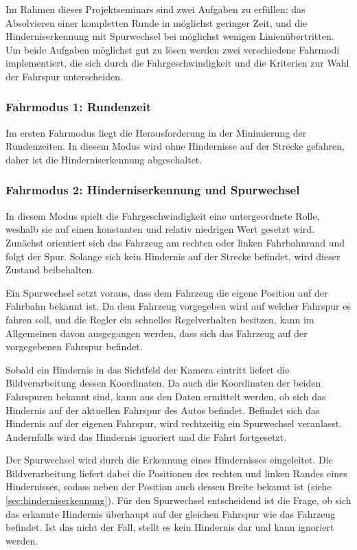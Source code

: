 Im Rahmen dieses Projektseminars sind zwei Aufgaben zu erfüllen: das Absolvieren einer kompletten Runde in möglichst geringer Zeit, und die Hinderniserkennung mit Spurwechsel bei möglichst wenigen Linienübertritten. Um beide Aufgaben möglichst gut zu lösen werden zwei verschiedene Fahrmodi implementiert, die sich durch die Fahrgeschwindigkeit und die Kriterien zur Wahl der Fahrspur unterscheiden.

\subsubsection{Fahrmodus 1: Rundenzeit}


Im ersten Fahrmodus liegt die Herausforderung in der Minimierung der Rundenzeiten. In diesem Modus wird ohne Hindernisse auf der Strecke gefahren, daher ist die Hinderniserkennung abgeschaltet. 

\subsubsection{Fahrmodus 2: Hinderniserkennung und Spurwechsel}

In diesem Modus spielt die Fahrgeschwindigkeit eine untergeordnete Rolle, weshalb sie auf einen konstanten und relativ niedrigen Wert gesetzt wird. Zunächst orientiert sich das Fahrzeug am rechten oder linken Fahrbahnrand und folgt der Spur. Solange sich kein Hindernis auf der Strecke befindet, wird dieser Zustand beibehalten. 

Ein Spurwechsel setzt voraus, dass dem Fahrzeug die eigene Position auf der Fahrbahn bekannt ist. Da dem Fahrzeug vorgegeben wird auf welcher Fahrspur es fahren soll, und die Regler ein schnelles Regelverhalten besitzen, kann im Allgemeinen davon ausgegangen werden, dass sich das Fahrzeug auf der vorgegebenen Fahrspur befindet.

Sobald ein Hindernis in das Sichtfeld der Kamera eintritt liefert die Bildverarbeitung dessen Koordinaten. Da auch die Koordinaten der beiden Fahrspuren bekannt sind, kann aus den Daten ermittelt werden, ob sich das Hindernis auf der aktuellen Fahrspur des Autos befindet. Befindet sich das Hindernis auf der eigenen Fahrspur, wird rechtzeitig ein Spurwechsel veranlasst. Andernfalls wird das Hindernis ignoriert und die Fahrt fortgesetzt.

Der Spurwechsel wird durch die Erkennung eines Hindernisses eingeleitet. Die Bildverarbeitung liefert dabei die Positionen des rechten und linken Randes eines Hindernisses, sodass neben der Position auch dessen Breite bekannt ist (siehe \ref{sec:hinderniserkennung}). Für den Spurwechsel entscheidend ist die Frage, ob sich das erkannte Hindernis überhaupt auf der gleichen Fahrspur wie das Fahrzeug befindet. Ist das nicht der Fall, stellt es kein Hindernis dar und kann ignoriert werden.


